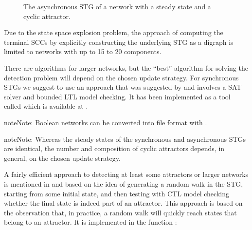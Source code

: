 \documentclass[letterpaper,10pt,english]{sphinxmanual}
\begin{document}
\begin{figure}[htbp]
\centering
\capstart

\noindent{}
\caption{The asynchronous STG  of a network with a steady state and a cyclic attractor.}\label{\detokenize{Manual:figure25}}\label{\detokenize{Manual:id29}}\end{figure}

Due to the state space explosion problem, the approach of computing the terminal SCCs by explicitly
constructing the underlying STG as a digraph is limited to networks with up to 15 to 20 components.

There are algorithms for larger networks, but the “best” algorithm for solving the detection problem will depend on the chosen update strategy.
For synchronous STGs we suggest to use an approach that was suggested
by {\hyperref[\detokenize{Bibliography:dubrova2011}]{}} and involves a SAT solver and bounded LTL model checking.
It has been implemented as a tool called  which is available at .

\begin{sphinxadmonition}{note}{Note:}
Boolean networks can be converted into  file format with {\hyperref[\detokenize{FileExchange:primes2bns}]{}}.
\end{sphinxadmonition}

\begin{sphinxadmonition}{note}{Note:}
Whereas the steady states of the synchronous and asynchronous STGs are identical,
the number and composition of cyclic attractors depends, in general, on the chosen update strategy.
\end{sphinxadmonition}

A fairly efficient approach to detecting at least some attractors or larger networks is mentioned in {\hyperref[\detokenize{Bibliography:klarner2015trap}]{}}
and based on the idea of generating a random walk in the STG, starting from some initial state,
and then testing with CTL model checking whether the final state is indeed part of an attractor.
This approach is based on the observation that, in practice, a random walk will quickly reach states that belong to an attractor.
It is implemented in the function {\hyperref[\detokenize{Attractors:find-attractor-state-by-randomwalk-and-ctl}]{}}:
\end{document}
